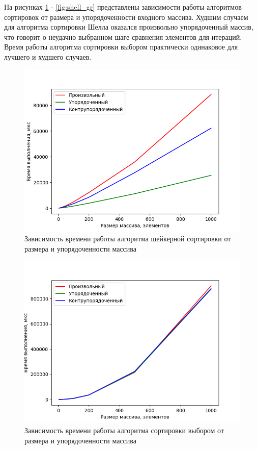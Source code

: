 \documentclass[a4paper,oneside,14pt]{extreport}
\begin{document}
На рисунках \ref{fig:shaker_gr} - \ref{fig:shell_gr} представлены зависимости работы алгоритмов сортировок от размера и упорядоченности входного массива. Худшим случаем для алгоритма сортировки Шелла оказался произвольно упорядоченный массив, что говорит о неудачно выбранном шаге сравнения элементов для итераций. Время работы алгоритма сортировки выбором практически одинаковое для лучшего и худшего случаев.

\begin{figure}[H]
	\centering
	\includegraphics[width=1\linewidth]{images/shaker_graph}
	\caption{Зависимость времени работы алгоритма шейкерной сортировки от размера и упорядоченности массива}
	\label{fig:shaker_gr}
\end{figure}
\begin{figure}[H]
	\centering
	\includegraphics[width=1\linewidth]{images/selection_graph}
	\caption{Зависимость времени работы алгоритма сортировки выбором от размера и упорядоченности массива}
	\label{fig:selection_gr}
\end{figure}
\end{document}
